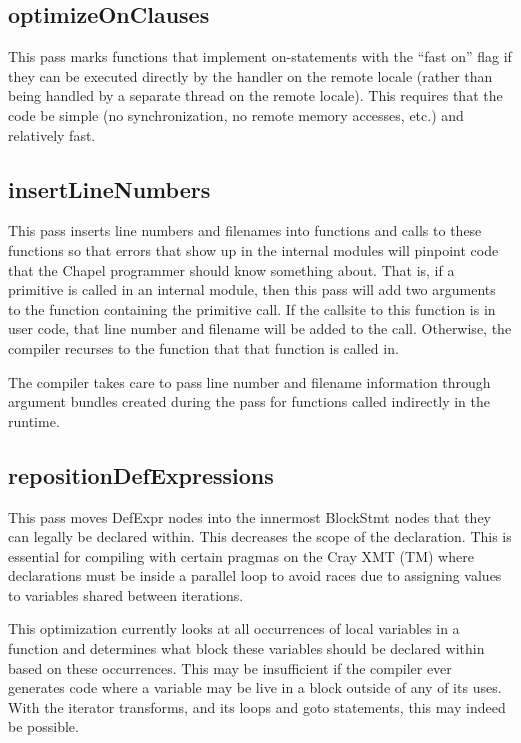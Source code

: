 \documentclass[10pt]{article}
\begin{document}
\subsection{optimizeOnClauses}

This pass marks functions that implement on-statements with the ``fast
on'' flag if they can be executed directly by the handler on the
remote locale (rather than being handled by a separate thread on the
remote locale).  This requires that the code be simple (no
synchronization, no remote memory accesses, etc.) and relatively fast.

\subsection{insertLineNumbers}

This pass inserts line numbers and filenames into functions and calls
to these functions so that errors that show up in the internal modules
will pinpoint code that the Chapel programmer should know something
about.  That is, if a primitive is called in an internal module, then
this pass will add two arguments to the function containing the
primitive call.  If the callsite to this function is in user code,
that line number and filename will be added to the call.  Otherwise,
the compiler recurses to the function that that function is called in.

The compiler takes care to pass line number and filename information
through argument bundles created during the  pass for
functions called indirectly in the runtime.

\subsection{repositionDefExpressions}

This pass moves DefExpr nodes into the innermost BlockStmt nodes that
they can legally be declared within.  This decreases the scope of the
declaration.  This is essential for compiling with certain pragmas on
the Cray XMT (TM) where declarations must be inside a parallel loop to
avoid races due to assigning values to variables shared between
iterations.

This optimization currently looks at all occurrences of local
variables in a function and determines what block these variables
should be declared within based on these occurrences.  This may be
insufficient if the compiler ever generates code where a variable may
be live in a block outside of any of its uses.  With the iterator
transforms, and its loops and goto statements, this may indeed be
possible.
\end{document}

